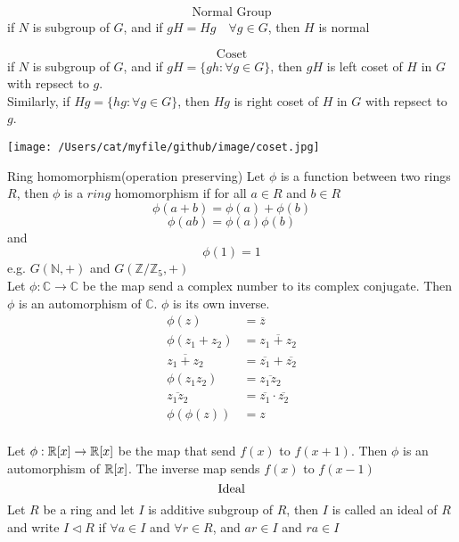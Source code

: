 \documentclass{book}
\newcommand{\polyringr}[2][R]{\mathbb{#1}\scalebox{1}[.95]{[}#2\scalebox{1}[.95]{]}}
\begin{document}
\[\text{Normal Group} \]
if $N$ is subgroup of $G$, and if $gH = Hg \quad \forall g \in G$, then $H$ is normal

\[ \text{Coset} \]
if $N$ is subgroup of $G$, and if $gH = \{gh: \forall g \in G \}$, then $gH$ is left coset of $H$ in $G$ with repsect to $g$.\\
Similarly, if $Hg = \{hg: \forall g \in G \}$, then $Hg$ is right coset of $H$ in $G$ with repsect to $g$.\\
\begin{center}
\texttt{[image: /Users/cat/myfile/github/image/coset.jpg]}\\
\end{center}

\newpage
Ring homomorphism(operation preserving)
Let $\phi$ is a function between two rings $R$, then $\phi$ is a $\mathit{ring}$ homomorphism if
for all $a \in R$ and $b \in R$ 
\[\phi(a+b) = \phi(a) + \phi(b)\] 
\[\phi(ab) = \phi(a)\phi(b)\]
and \[\phi(1) = 1\]
e.g. $G(\mathbb{N}, +)$ and $G(\mathbb{Z}/\mathbb{Z}_5, +)$\\

Let $\phi: \mathbb{C} \rightarrow \mathbb{C}$ be the map send a complex number to its complex conjugate. Then $\phi$ is an automorphism of $\mathbb{C}$. 
$\phi$ is its own inverse.\\

\begin{equation}
\begin{aligned}
\phi(z) &= \overline{z}\\
\phi(z_1 + z_2) &= \overline{z_1 + z_2}\\
\overline{z_1 + z_2} &= \overline{z_1} + \overline{z_2}\\
\phi(z_1 z_2) &= \overline{z_1 z_2}\\
\overline{z_1 z_2} &= \overline{z_1} \cdot \overline{z_2} \nonumber\\
\phi(\phi(z)) &= z\\
\end{aligned}
\end{equation}

Let $\phi: \polyringr{x} \rightarrow  \polyringr{x}$ be the map that send $f(x)$ to $f(x+1)$. Then $\phi$ is an automorphism of $\polyringr{x}$.   
The inverse map sends $f(x)$ to $f(x-1)$\\

\[ \text{Ideal}\\ \]
Let $R$ be a ring and let $I$ is additive subgroup of $R$, then $I$ is called an ideal of $R$ and write $I \triangleleft R$ 
\quad if $\forall a \in I$ and $\forall r \in R $, and $ ar \in I$ and $ra \in I$\\
\end{document}
